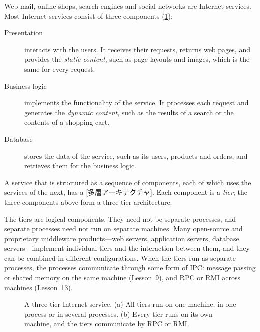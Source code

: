 \documentclass[../main.tex]{subfiles}
\begin{document}
Web mail, online shops, search engines and social networks are Internet
services.  Most Internet services consist of three components
(\cref{fig:l16-tiers}):
\begin{description}
  \item[Presentation] interacts with the users.  It receives their requests,
    returns web pages, and provides the \emph{static content}, such as page
    layouts and images, which is the same for every request.
  \item[Business logic] implements the functionality of the service.  It
    processes each request and generates the \emph{dynamic content}, such as
    the results of a search or the contents of a shopping cart.
  \item[Database] stores the data of the service, such as its users,
    products and orders, and retrieves them for the business logic.
\end{description}

\begin{definition}
  A service that is structured as a sequence of components, each of which
  uses the services of the next, has a
  [多層アーキテクチャ].  Each component is a
  \emph{tier}; the three components above form a three-tier architecture.
\end{definition}

The tiers are logical components.  They need not be separate processes, and
separate processes need not run on separate machines.  Many open-source and
proprietary middleware products---web servers, application servers,
database servers---implement individual tiers and the interaction between
them, and they can be combined in different configurations.  When the tiers
run as separate processes, the processes communicate through some form of
IPC: message passing or shared memory on the same machine (Lesson~9), and
RPC or RMI across machines (Lesson~13).

\begin{figure}[htbp]
  \centering
  
  \caption{A three-tier Internet service.  (a) All tiers run on one machine,
    in one process or in several processes.  (b) Every tier runs on its own
    machine, and the tiers communicate by RPC or RMI.}
  \label{fig:l16-tiers}
\end{figure}
\end{document}
